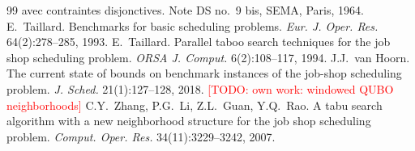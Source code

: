\documentclass[10pt,twocolumn]{article}
\newcommand{\todo}[1]{\textcolor{red}{[TODO: #1]}}
\begin{document}
\begin{thebibliography}{99}
avec contraintes disjonctives. Note DS no.~9 bis, SEMA, Paris, 1964.
 E.~Taillard. Benchmarks for basic scheduling
problems. \emph{Eur. J. Oper. Res.} 64(2):278--285, 1993.
 E.~Taillard. Parallel taboo search techniques for
the job shop scheduling problem. \emph{ORSA J. Comput.} 6(2):108--117,
1994.
 J.J.~van Hoorn. The current state of bounds on
benchmark instances of the job-shop scheduling problem. \emph{J. Sched.}
21(1):127--128, 2018.
 \todo{own work: windowed QUBO neighborhoods}
 C.Y.~Zhang, P.G.~Li, Z.L.~Guan, Y.Q.~Rao. A tabu
search algorithm with a new neighborhood structure for the job shop
scheduling problem. \emph{Comput. Oper. Res.} 34(11):3229--3242, 2007.
\end{thebibliography}
\end{document}
